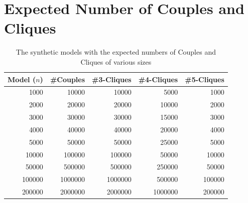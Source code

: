 \documentclass[a4paper,11pt]{article}
\begin{document}



\newpage
\appendix

\section{Expected Number of Couples and Cliques}
\label{sec:expected-numbers}

\begin{table}[!ht]
  \centering
  \begin{tabular}{| r | r | r | r | r |}
    \hline
    \textbf{Model (\(n\))} & \textbf{\#Couples} & \textbf{\#3-Cliques} & \textbf{\#4-Cliques} & \textbf{\#5-Cliques}\\
    \hline
    1000   & 10000   & 10000   & 5000    & 1000\\
    2000   & 20000   & 20000   & 10000   & 2000\\
    3000   & 30000   & 30000   & 15000   & 3000\\
    4000   & 40000   & 40000   & 20000   & 4000\\
    5000   & 50000   & 50000   & 25000   & 5000\\
    10000  & 100000  & 100000  & 50000   & 10000\\
    50000  & 500000  & 500000  & 250000  & 50000\\
    100000 & 1000000 & 1000000 & 500000  & 100000\\
    200000 & 2000000 & 2000000 & 1000000 & 200000\\
    \hline
\end{tabular}
\caption{The synthetic models with the expected numbers of Couples and Cliques of various sizes}
\label{tab:synthetic-numbers}
\end{table}
\end{document}

